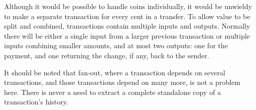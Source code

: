Although it would be possible to handle coins individually, it would be unwieldy to make a separate transaction for every cent in a transfer. To allow value to be split and combined, transactions contain multiple inputs and outputs. Normally there will be either a single input from a larger previous transaction or multiple inputs combining smaller amounts, and at most two outputs: one for the payment, and one returning the change, if any, back to the sender.

It should be noted that fan-out, where a transaction depends on several transactions, and those transactions depend on many more, is not a problem here. There is never a need to extract a complete standalone copy of a transaction's history.